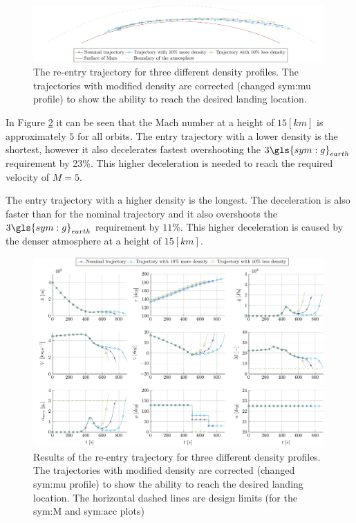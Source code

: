 \begin{figure}[h]
	\centering
	\includegraphics[width=0.99\textwidth]{Figure/Orbit/entry_mars.pdf}
	\caption[The re-entry trajectory for three different density profiles]{The re-entry trajectory for three different density profiles. The trajectories with modified density are corrected (changed \gls{sym:mu} profile) to show the ability to reach the desired landing location.}
	\label{fig:entry_mars}
\end{figure}

In Figure \ref{fig:orbit_entry_data} it can be seen that the Mach number at a height of $15 \left[km\right]$ is approximately $5$ for all orbits. The entry trajectory with a lower density is the shortest, however it also decelerates fastest overshooting the $3 \gls{sym:g}_{earth}$ requirement by 23\%. This higher deceleration is needed to reach the required velocity of $M=5$.

The entry trajectory with a higher density is the longest. The deceleration is also faster than for the nominal trajectory and it also overshoots the $3 \gls{sym:g}_{earth}$ requirement by $11\%$. This higher deceleration is caused by the denser atmosphere at a height of $15 \left[km\right]$.

\begin{figure}
	\centering
	\includegraphics[width=0.99\textwidth]{Figure/Orbit/sensitivity_entry.pdf}
	\caption[Results of the re-entry trajectory for three different density profiles]{Results of the re-entry trajectory for three different density profiles. The trajectories with modified density are corrected (changed \gls{sym:mu} profile) to show the ability to reach the desired landing location. The horizontal dashed lines are design limits (for the \gls{sym:M} and \gls{sym:acc} plots)}
	\label{fig:orbit_entry_data}
\end{figure}

